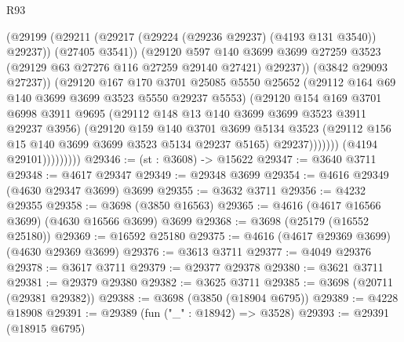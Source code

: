 \begin{lexlean}{R93}
\begin{coremodule}
                                (@29199
                                  (@29211
                                    (@29217 (@29224 (@29236 @29237) (@4193 @131 @3540)) @29237))
                                  (@27405 @3541))
                                (@29120
                                  @597
                                  @140
                                  @3699
                                  @3699
                                  @27259
                                  @3523
                                  (@29129 @63 @27276 @116 @27259 @29140 @27421)
                                  @29237))
                              (@3842 @29093 @27237))
                            (@29120
                              @167
                              @170
                              @3701
                              @25085
                              @5550
                              @25652
                              (@29112 @164 @69 @140 @3699 @3699 @3523 @5550 @29237 @5553)
                              (@29120
                                @154
                                @169
                                @3701
                                @6998
                                @3911
                                @9695
                                (@29112 @148 @13 @140 @3699 @3699 @3523 @3911 @29237 @3956)
                                (@29120
                                  @159
                                  @140
                                  @3701
                                  @3699
                                  @5134
                                  @3523
                                  (@29112 @156 @15 @140 @3699 @3699 @3523 @5134 @29237 @5165)
                                  @29237)))))))
                    (@4194 @29101)))))))))
@29346 := (st : @3608) -> @15622
@29347 := @3640 @3711
@29348 := @4617 @29347
@29349 := @29348 @3699
@29354 := @4616 @29349 (@4630 @29347 @3699) @3699
@29355 := @3632 @3711
@29356 := @4232 @29355
@29358 := @3698 (@3850 @16563)
@29365 := @4616 (@4617 @16566 @3699) (@4630 @16566 @3699) @3699
@29368 := @3698 (@25179 (@16552 @25180))
@29369 := @16592 @25180
@29375 := @4616 (@4617 @29369 @3699) (@4630 @29369 @3699)
@29376 := @3613 @3711
@29377 := @4049 @29376
@29378 := @3617 @3711
@29379 := @29377 @29378
@29380 := @3621 @3711
@29381 := @29379 @29380
@29382 := @3625 @3711
@29385 := @3698 (@20711 (@29381 @29382))
@29388 := @3698 (@3850 (@18904 @6795))
@29389 := @4228 @18908
@29391 := @29389 (fun ("_" : @18942) => @3528)
@29393 := @29391 (@18915 @6795)

\end{coremodule}
\end{lexlean}
